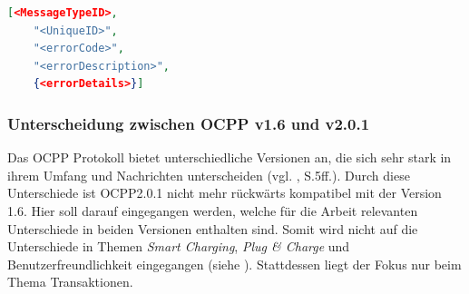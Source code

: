 \begin{lstlisting}[language=json, caption={CallError Nachrichten Aufbau \cite{Eigene_Darstellung, OCPP-1.6-edition-2}}, label=lst:CALLERROR, float]
	[<MessageTypeID>,
	"<UniqueID>",
	"<errorCode>",
	"<errorDescription>",
	{<errorDetails>}]
\end{lstlisting}
\subsubsection{Unterscheidung zwischen OCPP v1.6 und v2.0.1}
Das \acs{OCPP} Protokoll bietet unterschiedliche Versionen an, die sich sehr stark in ihrem Umfang und Nachrichten unterscheiden (vgl. \cite{OCPP-2.0.1-part0-introduction}, S.5ff.). Durch diese Unterschiede ist \acs{OCPP}2.0.1 nicht mehr rückwärts kompatibel mit der Version 1.6. Hier soll darauf eingegangen werden, welche für die Arbeit relevanten Unterschiede in beiden Versionen enthalten sind. Somit wird nicht auf die Unterschiede in Themen \textit{Smart Charging}, \textit{Plug \& Charge} und Benutzerfreundlichkeit eingegangen (siehe \cite{OCPP-2.0.1-part0-introduction}). Stattdessen liegt der Fokus nur beim Thema Transaktionen.\\

